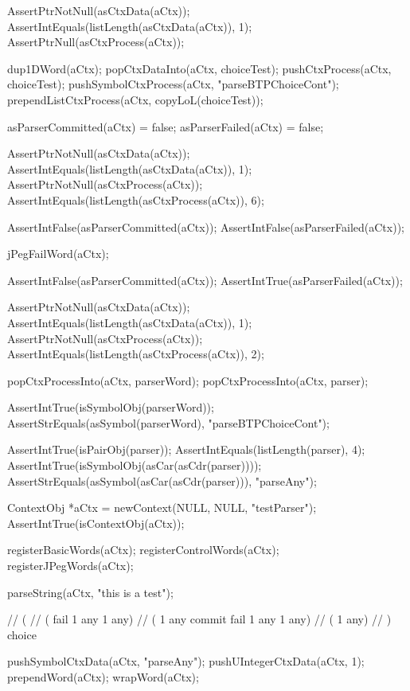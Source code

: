   AssertPtrNotNull(asCtxData(aCtx));
  AssertIntEquals(listLength(asCtxData(aCtx)), 1);
  AssertPtrNull(asCtxProcess(aCtx));
\stopCTest
\stopTestCase

\startCTest  
  dup1DWord(aCtx);
  popCtxDataInto(aCtx, choiceTest);
  pushCtxProcess(aCtx, choiceTest);
  pushSymbolCtxProcess(aCtx, "parseBTPChoiceCont");
  prependListCtxProcess(aCtx, copyLoL(choiceTest));
  
  asParserCommitted(aCtx) = false;
  asParserFailed(aCtx)    = false;
  
  AssertPtrNotNull(asCtxData(aCtx));
  AssertIntEquals(listLength(asCtxData(aCtx)), 1);
  AssertPtrNotNull(asCtxProcess(aCtx));
  AssertIntEquals(listLength(asCtxProcess(aCtx)), 6);
  
  AssertIntFalse(asParserCommitted(aCtx));
  AssertIntFalse(asParserFailed(aCtx));
  
  jPegFailWord(aCtx);
  
  AssertIntFalse(asParserCommitted(aCtx));
  AssertIntTrue(asParserFailed(aCtx));
  
  AssertPtrNotNull(asCtxData(aCtx));
  AssertIntEquals(listLength(asCtxData(aCtx)), 1);
  AssertPtrNotNull(asCtxProcess(aCtx));
  AssertIntEquals(listLength(asCtxProcess(aCtx)), 2);
  
  popCtxProcessInto(aCtx, parserWord);
  popCtxProcessInto(aCtx, parser);
  
  AssertIntTrue(isSymbolObj(parserWord));
  AssertStrEquals(asSymbol(parserWord), "parseBTPChoiceCont");
  
  AssertIntTrue(isPairObj(parser));
  AssertIntEquals(listLength(parser), 4);
  AssertIntTrue(isSymbolObj(asCar(asCdr(parser))));
  AssertStrEquals(asSymbol(asCar(asCdr(parser))), "parseAny");
\stopCTest
\stopTestCase


\startCTest
  ContextObj *aCtx = newContext(NULL, NULL, "testParser");
  AssertIntTrue(isContextObj(aCtx));
  
  registerBasicWords(aCtx);
  registerControlWords(aCtx);
  registerJPegWords(aCtx);

  parseString(aCtx, "this is a test");
  
  // (
  //   ( fail 1 any 1 any)
  //   ( 1 any commit fail 1 any 1 any)
  //   ( 1 any)
  // ) choice

  pushSymbolCtxData(aCtx, "parseAny");
  pushUIntegerCtxData(aCtx, 1);
  prependWord(aCtx);
  wrapWord(aCtx);
  

